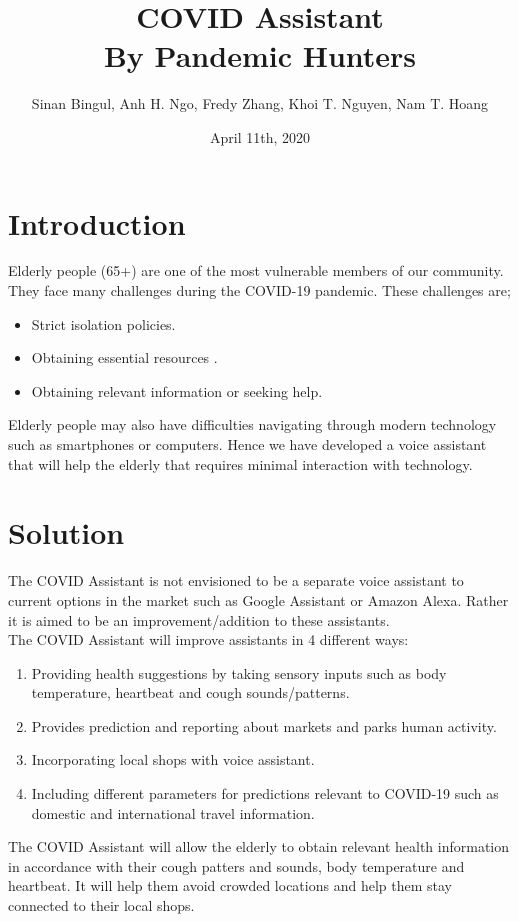 \documentclass{article}
\title{
{\Huge\bf COVID Assistant\\}
{\LARGE By Pandemic Hunters}
}
\author{\small Sinan Bingul, Anh H. Ngo, Fredy Zhang, Khoi T. Nguyen, Nam T. Hoang}
\date{April 11th, 2020}
\begin{document}
\maketitle

\section*{Introduction}
Elderly people (65+) are one of the most vulnerable members of our community. They face many challenges during the COVID-19 pandemic. These challenges are;

\begin{itemize}
    \item Strict isolation policies.
    \item Obtaining essential resources .
    \item Obtaining relevant information or seeking help.
\end{itemize}


Elderly people may also have difficulties navigating through modern technology such as smartphones or computers. Hence we have developed a voice assistant that will help the elderly that requires minimal interaction with technology.


\section*{Solution}
The COVID Assistant is not envisioned to be a separate voice assistant to current options in the market such as Google Assistant or Amazon Alexa. Rather it is aimed to be an improvement/addition to these assistants.\\
 
The COVID Assistant will improve assistants in 4 different ways:
\begin{enumerate}
    \item Providing health suggestions by taking sensory inputs such as body temperature, heartbeat and cough sounds/patterns.
    \item Provides prediction and reporting about markets and parks human activity.
    \item Incorporating local shops with voice assistant.
    \item Including different parameters for predictions relevant to COVID-19 such as domestic and international travel information.
\end{enumerate}


The COVID Assistant will allow the elderly to obtain relevant health information in accordance with their cough patters and sounds, body temperature and heartbeat. It will help them avoid crowded locations and help them stay connected to their local shops.
\end{document}

